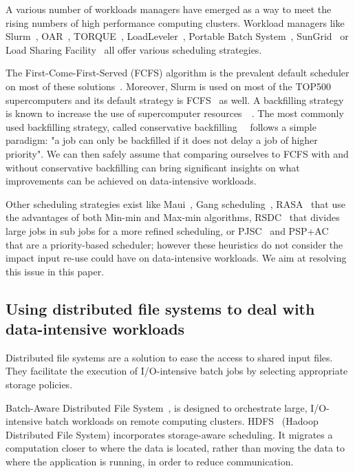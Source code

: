 \documentclass[conference,10pt]{IEEEtran}
\begin{document}
A various number of workloads managers have emerged 
as a way to meet the rising numbers of high performance computing clusters.
Workload managers like Slurm~\cite{SLURM}, OAR~\cite{oar},
TORQUE~\cite{torque}, LoadLeveler~\cite{loadleveler},
Portable Batch System~\cite{pbs}, SunGrid~\cite{sungrid}
or Load Sharing Facility~\cite{lsf} all offer
various scheduling strategies.

The First-Come-First-Served (FCFS) algorithm is the prevalent default
scheduler on most of these solutions~\cite{survey_workload_manager_and_scheduler}.
Moreover, Slurm is used on most of the TOP500 supercomputers and its default strategy is FCFS~\cite{slurm_website_scheduling} as well.
A backfilling strategy is known to increase
the use of supercomputer resources~\cite{maui}~\cite{New_Backfill}. 
The most commonly used backfilling strategy, called conservative 
backfilling~\cite{Characterization_of_Backfilling}~\cite{Introducing-New-Backfill-based} follows
a simple paradigm: "a job can only be backfilled if it does not
delay a job of higher priority".
We can then safely assume that comparing ourselves to FCFS with and without conservative backfilling can 
bring significant insights on what improvements can be achieved on data-intensive workloads.

Other scheduling strategies exist like 
Maui~\cite{Maui_Scheduler}, Gang scheduling~\cite{gang_scheduling}, 
RASA~\cite{rasa} that use the advantages of both Min-min and Max-min algorithms,
RSDC~\cite{rsdc} that divides large jobs in sub jobs for a more refined scheduling,
or PJSC~\cite{pjsc} and PSP+AC~\cite{PSP_AC} that are a priority-based scheduler; 
however these heuristics do not consider the impact
input re-use could have on data-intensive workloads.
We aim at resolving this issue in this paper.

\subsection{Using distributed file systems to deal with data-intensive workloads}

Distributed file systems are a solution to ease the access to 
shared input files. They facilitate the execution of I/O-intensive batch
jobs by selecting appropriate storage policies.

Batch-Aware Distributed File System~\cite{Explicit_Control_in_a_Batch-Aware_Distributed_File_System},
is designed to orchestrate large, I/O-intensive batch workloads on remote computing clusters.
HDFS~\cite{hdfs} (Hadoop Distributed File System)
incorporates storage-aware scheduling. 
It migrates a computation closer to where the data is
located, rather than moving the data to where the application is
running, in order to reduce communication.
\end{document}

